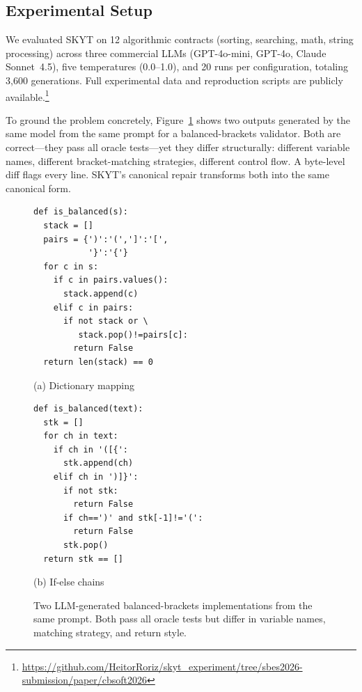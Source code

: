 \documentclass[sigconf]{acmart}
\begin{document}
\subsection{Experimental Setup}
\label{sec:setup}

We evaluated SKYT on 12 algorithmic contracts (sorting, searching, math, string processing) across three commercial LLMs (GPT-4o-mini, GPT-4o, Claude Sonnet~4.5), five temperatures (0.0--1.0), and 20 runs per configuration, totaling 3{,}600 generations.  Full experimental data and reproduction scripts are publicly available.\footnote{\url{https://github.com/HeitorRoriz/skyt_experiment/tree/sbes2026-submission/paper/cbsoft2026}}

To ground the problem concretely, Figure~\ref{fig:example} shows two outputs generated by the same model from the same prompt for a balanced-brackets validator.  Both are correct---they pass all oracle tests---yet they differ structurally: different variable names, different bracket-matching strategies, different control flow.  A byte-level diff flags every line.  SKYT's canonical repair transforms both into the same canonical form.

\begin{figure}[t]
\centering
\begin{minipage}[t]{0.48\columnwidth}
{\scriptsize
\begin{verbatim}
def is_balanced(s):
  stack = []
  pairs = {')':'(',']':'[',
           '}':'{'}
  for c in s:
    if c in pairs.values():
      stack.append(c)
    elif c in pairs:
      if not stack or \
         stack.pop()!=pairs[c]:
        return False
  return len(stack) == 0
\end{verbatim}
}
\centerline{\small (a) Dictionary mapping}
\end{minipage}
\hfill
\begin{minipage}[t]{0.48\columnwidth}
{\scriptsize
\begin{verbatim}
def is_balanced(text):
  stk = []
  for ch in text:
    if ch in '([{':
      stk.append(ch)
    elif ch in ')]}':
      if not stk:
        return False
      if ch==')' and stk[-1]!='(':
        return False
      stk.pop()
  return stk == []
\end{verbatim}
}
\centerline{\small (b) If-else chains}
\end{minipage}
\caption{Two LLM-generated balanced-brackets implementations from the same prompt.  Both pass all oracle tests but differ in variable names, matching strategy, and return style.}
\label{fig:example}
\end{figure}
\end{document}

